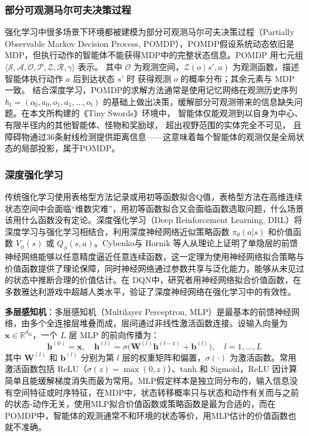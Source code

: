 \documentclass[12pt, a4paper, UTF8]{ctexart}
\numberwithin{equation}{section}
\begin{document}
\subsubsection{部分可观测马尔可夫决策过程}
强化学习中很多场景下环境都被建模为部分可观测马尔可夫决策过程（Partially Observable Markov Decision Process, POMDP），POMDP假设系统动态依旧是MDP，但执行动作的智能体不能获得MDP中的完整状态信息。POMDP 用七元组 $\langle \mathcal{S}, \mathcal{A}, \mathcal{O}, \mathcal{P}, \mathcal{Z}, \mathcal{R}, \gamma \rangle$ 表示。 其中 $\mathcal{O}$ 为观测空间，$\mathcal{Z}(o \mid s', a)$ 为观测函数，描述智能体执行动作 $a$ 后到达状态 $s'$ 时 获得观测 $o$ 的概率分布；其余元素与 MDP 一致。 结合深度学习，POMDP的求解方法通常是使用记忆网络在观测历史序列 $h_t = (o_0, a_0, o_1, a_1, \ldots, o_t)$ 的基础上做出决策，缓解部分可观测带来的信息缺失问题。在本文所构建的《Tiny Swords》环境中， 智能体仅能观测到以自身为中心、有限半径内的其他智能体、怪物和奖励球， 超出视野范围的实体完全不可见， 且障碍物通过36条射线检测提供距离信息——这意味着每个智能体的观测仅是全局状态的局部投影，属于POMDP。

\subsubsection{深度强化学习}

传统强化学习使用表格型方法记录或用初等函数拟合Q值，表格型方法在高维连续状态空间中会面临“维数灾难”，用初等函数拟合又会面临函数选取问题，什么场景该用什么函数没有定论。深度强化学习（Deep Reinforcement Learning, DRL）将深度学习与强化学习相结合\cite{Wang2020DeepRL}，利用深度神经网络近似策略函数 $\pi_\theta(a|s)$ 和价值函数 $V_\phi(s)$ 或 $Q_\phi(s,a)$。Cybenko与 Hornik 等人从理论上证明了单隐层的前馈神经网络能够以任意精度逼近任意连续函数\cite{cybenko1989approximation,hornik1989multilayer}，这一定理为使用神经网络拟合策略与价值函数提供了理论保障，同时神经网络通过参数共享与泛化能力，能够从未见过的状态中推断合理的价值估计。在 DQN中，研究者用神经网络拟合价值函数，在多数雅达利游戏中超越人类水平，验证了深度神经网络在强化学习中的有效性。

\textbf{多层感知机}：多层感知机（Multilayer Perceptron, MLP）是最基本的前馈神经网络，由多个全连接层堆叠而成，层间通过非线性激活函数连接。设输入向量为 $\mathbf{x} \in \mathbb{R}^{d_{\text{in}}}$，一个 $L$ 层 MLP 的前向传播为：
\begin{equation}
  \mathbf{h}^{(0)} = \mathbf{x},\quad
  \mathbf{h}^{(l)} = \sigma\bigl( \mathbf{W}^{(l)} \mathbf{h}^{(l-1)} + \mathbf{b}^{(l)} \bigr),\quad l = 1,\dots,L
  \label{eq:mlp}
\end{equation}
其中 $\mathbf{W}^{(l)}$ 和 $\mathbf{b}^{(l)}$ 分别为第 $l$ 层的权重矩阵和偏置，$\sigma(\cdot)$ 为激活函数。常用激活函数包括 ReLU（$\sigma(z)=\max(0,z)$）、tanh 和 Sigmoid，ReLU 因计算简单且能缓解梯度消失而最为常用。MLP假定样本是独立同分布的，输入信息没有空间特征或时序特征，在MDP中，状态转移概率只与状态和动作有关而与之前的状态-动作无关，使用MLP拟合价值函数或策略函数是最为合适的，而在POMDP中，智能体的观测通常不和环境的状态等价，用MLP估计的价值函数也就不准确。
\end{document}
